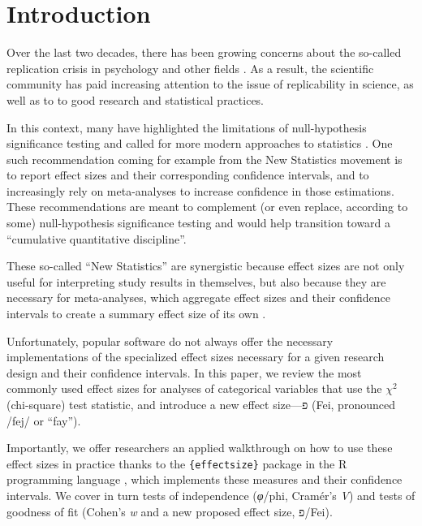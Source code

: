 \documentclass[mathematics,article,submit,moreauthors,pdftex]{mdpi}
\begin{document}

\hypertarget{introduction}{%
\section{Introduction}\label{introduction}}

Over the last two decades, there has been growing concerns about the
so-called replication crisis in psychology and other fields
\citep{OSC2015estimating, camerer2018evaluating}. As a result, the
scientific community has paid increasing attention to the issue of
replicability in science, as well as to to good research and statistical
practices.

In this context, many have highlighted the limitations of
null-hypothesis significance testing and called for more modern
approaches to statistics \citep{cumming2014new}. One such recommendation
coming for example from the New Statistics movement is to report effect
sizes and their corresponding confidence intervals, and to increasingly
rely on meta-analyses to increase confidence in those estimations. These
recommendations are meant to complement (or even replace, according to
some) null-hypothesis significance testing and would help transition
toward a ``cumulative quantitative discipline''.

These so-called ``New Statistics'' are synergistic because effect sizes
are not only useful for interpreting study results in themselves, but
also because they are necessary for meta-analyses, which aggregate
effect sizes and their confidence intervals to create a summary effect
size of its own \citep[\citet{wiernik2020unbiased}]{degeest2010impact}.

Unfortunately, popular software do not always offer the necessary
implementations of the specialized effect sizes necessary for a given
research design and their confidence intervals. In this paper, we review
the most commonly used effect sizes for analyses of categorical
variables that use the \(\chi^2\) (chi-square) test statistic, and
introduce a new effect size---פ (Fei, pronounced /fej/ or ``fay'').

Importantly, we offer researchers an applied walkthrough on how to use
these effect sizes in practice thanks to the \texttt{\{effectsize\}}
package \citep{benshachar2020effectsize} in the R programming language
\citep{base2023}, which implements these measures and their confidence
intervals. We cover in turn tests of independence (\emph{φ}/phi,
Cramér's \emph{V}) and tests of goodness of fit (Cohen's \emph{w} and a
new proposed effect size, פ/Fei).
\end{document}
